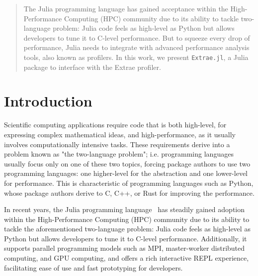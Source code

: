 \documentclass{juliacon}
\newcommand{\jlpkg}[1]{\texttt{#1}}
\newcommand{\extraejl}{\jlpkg{Extrae.jl}}
\begin{document}


\maketitle

\begin{abstract}
The Julia programming language has gained acceptance within the High-Performance Computing (HPC) community due to its ability to tackle two-language problem: Julia code feels as high-level as Python but allows developers to tune it to C-level performance.
But to squeeze every drop of performance, Julia needs to integrate with advanced performance analysis tools, also known as profilers.
In this work, we present \extraejl, a Julia package to interface with the Extrae profiler. %
\end{abstract}


\section{Introduction}

Scientific computing applications require code that is both high-level, for expressing complex mathematical ideas, and high-performance, as it usually involves computationally intensive tasks.
These requirements derive into a problem known as "the two-language problem"; i.e. programming languages usually focus only on one of these two topics, forcing package authors to use two programming languages: one higher-level for the abstraction and one lower-level for performance.
This is characteristic of programming languages such as Python, whose package authors derive to C, C++, or Rust for improving the performance.

In recent years, the Julia programming language~\cite{bezanson2017julia} has steadily gained adoption within the High-Performance Computing (HPC) community due to its ability to tackle the aforementioned two-language problem: Julia code feels as high-level as Python but allows developers to tune it to C-level performance.
Additionally, it supports parallel programming models such as MPI, master-worker distributed computing, and GPU computing, and offers a rich interactive REPL experience, facilitating ease of use and fast prototyping for developers.
\end{document}
